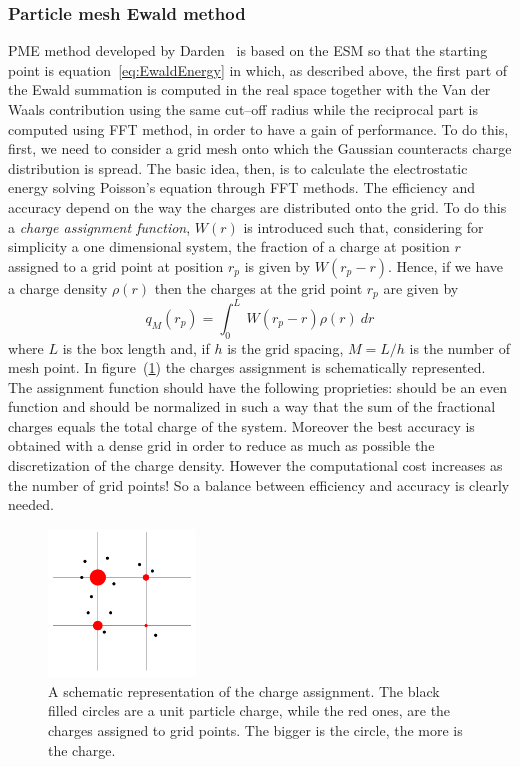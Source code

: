 \subsubsection{Particle mesh Ewald method}
\acf{PME} method developed by Darden \etal\, \cite{DardenPME} is based on the \ac{ESM} so that the starting point is equation~\eqref{eq:EwaldEnergy} in which, as described above, the first part of the Ewald summation is computed in the real space together with the Van der Waals contribution using the same cut--off radius while the reciprocal part is computed using \ac{FFT} method, in order to have a gain of performance. To do this, first, we need to consider a grid mesh onto which the Gaussian counteracts charge distribution is spread. The basic idea, then, is to calculate the electrostatic energy solving Poisson's equation through \ac{FFT} methods. The efficiency and accuracy depend on the way the charges are distributed onto the grid. To do this a \textit{charge assignment function}, $W(r)$ is introduced such that, considering for simplicity a one dimensional system, the fraction of a charge at position $r$ assigned to a grid point at position $r_p$ is given by $W(r_p - r)$. Hence, if we have a charge density $\rho(r)$ then the charges at the grid point $r_p$ are given by
\begin{equation}
	q_M(r_p) = \int_0^L\ W(r_p - r) \rho (r)\ dr
	\label{eq:meshAssign}
\end{equation}
where $L$ is the box length and, if $h$ is the grid spacing, $M = L/h$ is the number of mesh point. In figure~(\ref{fig:gidAssign}) the charges assignment is schematically represented. The assignment function should have the following proprieties: should be an even function and should be normalized in such a way that the sum of the fractional charges equals the total charge of the system. Moreover the best accuracy is obtained with a dense grid in order to reduce as much as possible the discretization of the charge density. However the computational cost increases as the number of grid points! So a balance between efficiency and accuracy is clearly needed.
\begin{figure}
	\includegraphics[width=0.35\textwidth]{./img/gridCharge/gridCharge}
	\caption{A schematic representation of the charge assignment. The black filled circles are a unit particle charge, while the red ones, are the charges assigned to grid points. The bigger is the circle, the more is the charge.}
	\label{fig:gidAssign}
\end{figure}

